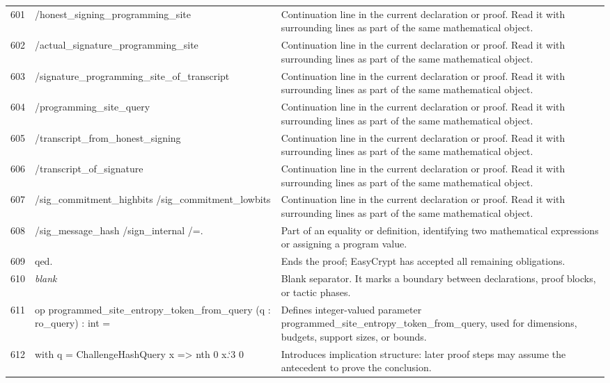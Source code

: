 \documentclass[10pt]{article}
\begin{document}
\begin{longtable}{r L{0.53\textwidth} L{0.37\textwidth}}
601 & {\ttfamily\scriptsize            /honest\_signing\_programming\_site} & Continuation line in the current declaration or proof.  Read it with surrounding lines as part of the same mathematical object. \\
602 & {\ttfamily\scriptsize            /actual\_signature\_programming\_site} & Continuation line in the current declaration or proof.  Read it with surrounding lines as part of the same mathematical object. \\
603 & {\ttfamily\scriptsize            /signature\_programming\_site\_of\_transcript} & Continuation line in the current declaration or proof.  Read it with surrounding lines as part of the same mathematical object. \\
604 & {\ttfamily\scriptsize            /programming\_site\_query} & Continuation line in the current declaration or proof.  Read it with surrounding lines as part of the same mathematical object. \\
605 & {\ttfamily\scriptsize            /transcript\_from\_honest\_signing} & Continuation line in the current declaration or proof.  Read it with surrounding lines as part of the same mathematical object. \\
606 & {\ttfamily\scriptsize            /transcript\_of\_signature} & Continuation line in the current declaration or proof.  Read it with surrounding lines as part of the same mathematical object. \\
607 & {\ttfamily\scriptsize            /sig\_commitment\_highbits /sig\_commitment\_lowbits} & Continuation line in the current declaration or proof.  Read it with surrounding lines as part of the same mathematical object. \\
608 & {\ttfamily\scriptsize            /sig\_message\_hash /sign\_internal /=.} & Part of an equality or definition, identifying two mathematical expressions or assigning a program value. \\
609 & {\ttfamily\scriptsize qed.} & Ends the proof; EasyCrypt has accepted all remaining obligations. \\
610 & {\ttfamily\scriptsize \emph{blank}} & Blank separator.  It marks a boundary between declarations, proof blocks, or tactic phases. \\
611 & {\ttfamily\scriptsize op programmed\_site\_entropy\_token\_from\_query (q : ro\_query) : int =} & Defines integer-valued parameter programmed\_site\_entropy\_token\_from\_query, used for dimensions, budgets, support sizes, or bounds. \\
612 & {\ttfamily\scriptsize   with q = ChallengeHashQuery x => nth 0 x.`3 0} & Introduces implication structure: later proof steps may assume the antecedent to prove the conclusion. \\

\end{longtable}
\end{document}

